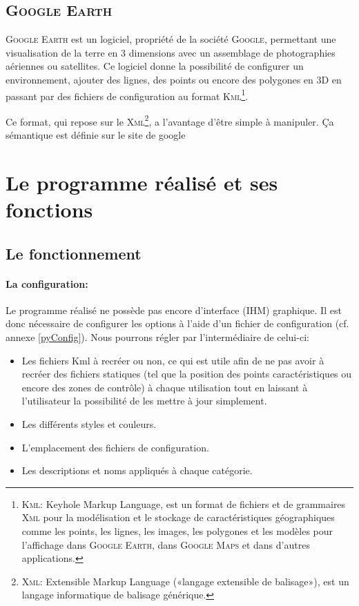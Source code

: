     \subsection{\textsc{Google Earth}}
\textsc{Google Earth} est un logiciel, propriété de la société \textsc{Google}, permettant une visualisation de la terre en 3 dimensions avec un assemblage de photographies aériennes ou satellites. Ce logiciel donne la possibilité de configurer un environnement, ajouter des lignes, des points ou encore des polygones en 3D en passant par des fichiers de configuration au format \textsc{Kml}\footnote{\label{Kml}\textsc{Kml}: Keyhole Markup Language, est un format de fichiers et de grammaires \textsc{Xml} pour la modélisation et le stockage de caractéristiques géographiques comme les points, les lignes, les images, les polygones et les modèles pour l'affichage dans \textsc{Google Earth}, dans \textsc{Google Maps} et dans d'autres applications.}.

Ce format, qui repose sur le \textsc{Xml}\footnote{\textsc{Xml}: Extensible Markup Language («langage extensible de balisage»), est un langage informatique de balisage générique.}, a l'avantage d’être simple à manipuler. Ça sémantique est définie sur le site de google  



\section{Le programme réalisé et ses fonctions}
    \subsection{Le fonctionnement\label{fonctionnement}}
            \paragraph{La configuration:}
Le programme réalisé ne possède pas encore d'interface (IHM) graphique. Il est donc nécessaire de configurer les options à l'aide d'un fichier de configuration (cf. annexe \vref{pyConfig}). Nous pourrons régler par l'intermédiaire de celui-ci:
\begin{itemize}
    \item Les fichiers Kml à recréer ou non, ce qui est utile afin de ne pas avoir à recréer des fichiers statiques (tel que la position des points caractéristiques ou encore des zones de contrôle) à chaque utilisation tout en laissant à l'utilisateur la possibilité de les mettre à jour simplement.
    \item Les différents styles et couleurs.
    \item L'emplacement des fichiers de configuration.
    \item Les descriptions et noms appliqués à chaque catégorie.
\end{itemize}\medskip
